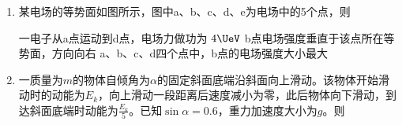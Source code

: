 \documentclass[\gkver]{gaokaozhenti}
\begin{document}
\begin{enumerate}
{设与 $1.8\times10^{5}\Us$ 的椭圆形停泊轨道周期相同的圆形轨道半径为 $r$，由万有引力提供向心力可知

$\frac{GMm}{r^{2}}=m\frac{4\pi^{2}}{T^{2}}r$ ②

设近火点到火星中心为

$R_{1}=R+d_{1}$ ③

设远火点到火星中心为

$R_{2}=R+d_{2}$ ④

由开普勒第三定律可知

$\frac{r^{3}}{T^{2}}=\frac{\left(\frac{R_{1}+R_{2}}{2}\right)^{3}}{T^{2}}$ ⑤

由以上分析可得：$d\approx6\times10^{7}\Um$。故选 C。
}

\item
某电场的等势面如图所示，图中a、b、c、d、e为电场中的5个点，则


{一电子从a点运动到d点，电场力做功为 $4\UeV$}
{b点电场强度垂直于该点所在等势面，方向向右}
{a、b、c、d四个点中，b点的电场强度大小最大}


\item
一质量为$m$的物体自倾角为$\alpha$的固定斜面底端沿斜面向上滑动。该物体开始滑动时的动能为$E_{k}$，向上滑动一段距离后速度减小为零，此后物体向下滑动，到达斜面底端时动能为$\frac{E_{k}}{5}$。已知$\sin\alpha=0.6$，重力加速度大小为$g$。则


\end{enumerate}
\end{document}
